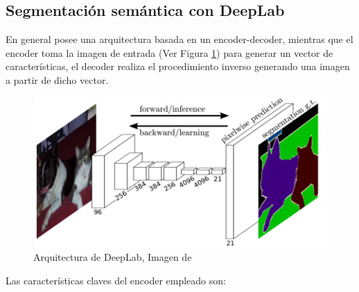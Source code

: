 \subsection{Segmentación semántica con DeepLab}
En general posee una arquitectura basada en un encoder-decoder, mientras que el encoder toma la imagen de entrada (Ver Figura \ref{encoder_decoder}) para generar un vector de características, el decoder realiza el procedimiento inverso generando una imagen a partir de dicho vector. 
\begin{figure}[H]
    \centering
    \includegraphics[scale=0.6]{Recursos/encoder_decoder.png}
    \caption{Arquitectura de DeepLab, Imagen de \cite{fullyConectedNet}}
    \label{encoder_decoder}
\end{figure}
Las características claves del encoder empleado son:
